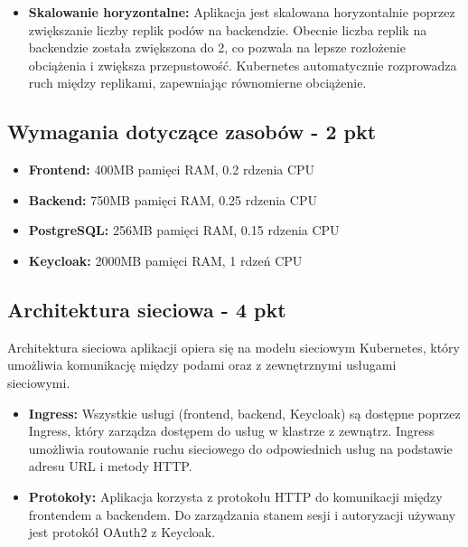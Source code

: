 \documentclass[12pt,a4paper]{article}
\begin{document}
\begin{itemize}
\item \textbf{Skalowanie horyzontalne:} Aplikacja jest skalowana horyzontalnie poprzez zwiększanie liczby replik podów na backendzie. Obecnie liczba replik na backendzie została zwiększona do 2, co pozwala na lepsze rozłożenie obciążenia i zwiększa przepustowość. Kubernetes automatycznie rozprowadza ruch między replikami, zapewniając równomierne obciążenie.

\end{itemize}

\subsection{Wymagania dotyczące zasobów - 2 pkt}
\label{sec:ExampleTables}

\begin{itemize}
\item \textbf{Frontend:} 400MB pamięci RAM, 0.2 rdzenia CPU
\item \textbf{Backend:} 750MB pamięci RAM, 0.25 rdzenia CPU
\item \textbf{PostgreSQL:} 256MB pamięci RAM, 0.15 rdzenia CPU
\item \textbf{Keycloak:} 2000MB pamięci RAM, 1 rdzeń CPU
\end{itemize}


\subsection{Architektura sieciowa - 4 pkt}
\label{sec:ExampleResults}

Architektura sieciowa aplikacji opiera się na modelu sieciowym Kubernetes, który umożliwia komunikację między podami oraz z zewnętrznymi usługami sieciowymi.

\begin{itemize}
\item \textbf{Ingress:} Wszystkie usługi (frontend, backend, Keycloak) są dostępne poprzez Ingress, który zarządza dostępem do usług w klastrze z zewnątrz. Ingress umożliwia routowanie ruchu sieciowego do odpowiednich usług na podstawie adresu URL i metody HTTP.

\item \textbf{Protokoły:} Aplikacja korzysta z protokołu HTTP do komunikacji między frontendem a backendem. Do zarządzania stanem sesji i autoryzacji używany jest protokół OAuth2 z Keycloak.

\end{itemize}

\nocite{*}
\end{document}
